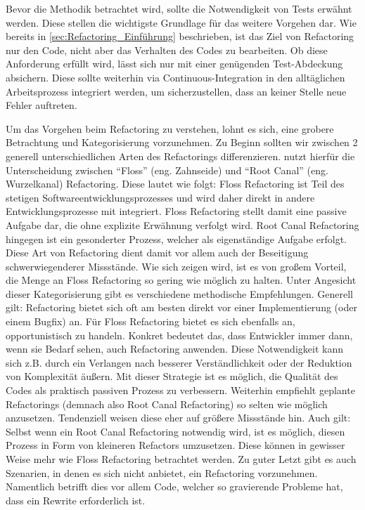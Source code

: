 \documentclass[acmtog]{acmart}
\begin{document}
Bevor die Methodik betrachtet wird, sollte die Notwendigkeit von Tests erwähnt werden. Diese stellen die wichtigste Grundlage für das weitere Vorgehen dar. Wie bereits in \ref{sec:Refactoring_Einführung} beschrieben, ist das Ziel von Refactoring nur den Code, nicht aber das Verhalten des Codes zu bearbeiten. Ob diese Anforderung erfüllt wird, lässt sich nur mit einer genügenden Test-Abdeckung absichern. Diese sollte weiterhin via Continuous-Integration in den alltäglichen Arbeitsprozess integriert werden, um sicherzustellen, dass an keiner Stelle neue Fehler auftreten. \cite{fowler2019refactoring}

Um das Vorgehen beim Refactoring zu verstehen, lohnt es sich, eine grobere Betrachtung und Kategorisierung vorzunehmen. Zu Beginn sollten wir zwischen 2 generell unterschiedlichen Arten des Refactorings differenzieren. \cite{inproceedingsHowWeRefactor} nutzt hierfür die Unterscheidung zwischen “Floss” (eng. Zahnseide) und “Root Canal” (eng. Wurzelkanal) Refactoring. Diese lautet wie folgt: Floss Refactoring ist Teil des stetigen Softwareentwicklungsprozesses und wird daher direkt in andere Entwicklungsprozesse mit integriert. Floss Refactoring stellt damit eine passive Aufgabe dar, die ohne explizite Erwähnung verfolgt wird. Root Canal Refactoring hingegen ist ein gesonderter Prozess, welcher als eigenständige Aufgabe erfolgt. Diese Art von Refactoring dient damit vor allem auch der Beseitigung schwerwiegenderer Missstände. Wie sich zeigen wird, ist es von großem Vorteil, die Menge an Floss Refactoring so gering wie möglich zu halten. \cite{articlePerspectives}
Unter Angesicht dieser Kategorisierung gibt es verschiedene methodische Empfehlungen. Generell gilt: Refactoring bietet sich oft am besten direkt vor einer Implementierung (oder einem Bugfix) an. Für Floss Refactoring bietet es sich ebenfalls an, opportunistisch zu handeln. Konkret bedeutet das, dass Entwickler immer dann, wenn sie Bedarf sehen, auch Refactoring anwenden. Diese Notwendigkeit kann sich z.B. durch ein Verlangen nach besserer Verständlichkeit oder der Reduktion von Komplexität äußern. Mit dieser Strategie ist es möglich, die Qualität des Codes als praktisch passiven Prozess zu verbessern.
Weiterhin empfiehlt \cite{fowler2019refactoring} geplante Refactorings (demnach also Root Canal Refactoring) so selten wie möglich anzusetzen. Tendenziell weisen diese eher auf größere Missstände hin. Auch gilt: Selbst wenn ein Root Canal Refactoring notwendig wird, ist es möglich, diesen Prozess in Form von kleineren Refactors umzusetzen. Diese können in gewisser Weise mehr wie Floss Refactoring betrachtet werden.
Zu guter Letzt gibt es auch Szenarien, in denen es sich nicht anbietet, ein Refactoring vorzunehmen. Namentlich betrifft dies vor allem Code, welcher so gravierende Probleme hat, dass ein Rewrite erforderlich ist. \cite{fowler2019refactoring}
\end{document}
